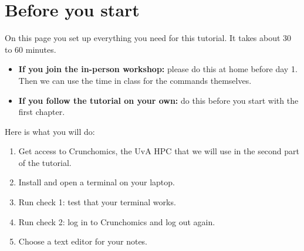 \documentclass[
  letterpaper,
  DIV=11,
  numbers=noendperiod]{scrreprt}
\author{}
\date{}
\providecommand{\tightlist}{%
  \setlength{\itemsep}{0pt}\setlength{\parskip}{0pt}}
\renewcommand*\contentsname{Table of contents}
\newcommand\contentsname{Table of contents}
\begin{document}

\renewcommand*\contentsname{Table of contents}
{
\hypersetup{linkcolor=}
\setcounter{tocdepth}{2}
\tableofcontents
}

\chapter{Before you start}\label{before-you-start}

On this page you set up everything you need for this tutorial. It takes
about 30 to 60 minutes.

\begin{itemize}
\tightlist
\item
  \textbf{If you join the in-person workshop:} please do this at home
  before day 1. Then we can use the time in class for the commands
  themselves.
\item
  \textbf{If you follow the tutorial on your own:} do this before you
  start with the first chapter.
\end{itemize}

Here is what you will do:

\begin{enumerate}
\def\labelenumi{\arabic{enumi}.}
\tightlist
\item
  Get access to Crunchomics, the UvA HPC that we will use in the second
  part of the tutorial.
\item
  Install and open a terminal on your laptop.
\item
  Run check 1: test that your terminal works.
\item
  Run check 2: log in to Crunchomics and log out again.
\item
  Choose a text editor for your notes.
\end{enumerate}
\end{document}
